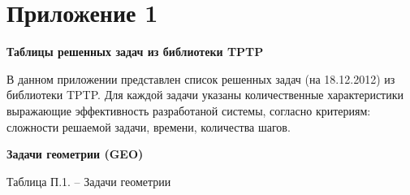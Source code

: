 \chapter*{Приложение 1}

\vspace{5cm}

\begin{center}
\textbf{\LARGE{Таблицы решенных задач из библиотеки TPTP}}
\end{center}

\newpage






В данном приложении представлен список решенных задач (на 18.12.2012) из библиотеки TPTP. Для каждой задачи указаны количественные характеристики выражающие эффективность разработаной системы, согласно критериям: сложности решаемой задачи, времени, количества шагов.

\textbf{Задачи геометрии (GEO)}

\begin{center}
Таблица П.1. -- Задачи геометрии
\end{center}

